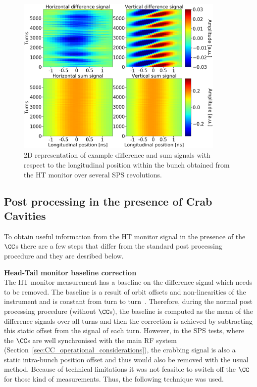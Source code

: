 \begin{figure}[!h]
   \centering         
   \includegraphics[width=0.9\textwidth]{images/Ch4/HT_2D__20180530_135105_colorbar_new_version.png}
       \caption{2D representation of example difference and sum signals with respect to the longitudinal position within the bunch obtained from the HT monitor over several SPS revolutions.}
       \label{fig:HT_example_signals_2D}
\end{figure}

\subsection{Post processing in the presence of Crab Cavities}\label{subsec:HT_post_process_CC}
To obtain useful information from the HT monitor signal in the presence of the $\CC$s there are a few steps that differ from the standard post processing procedure and they are desribed below.

\normalsize{\textbf{Head-Tail monitor baseline correction}}\\
The HT monitor measurement has a baseline on the difference signal which needs to be removed. The baseline is a result of orbit offsets and non-linearities of the instrument and is constant from turn to turn~\cite{Levens:2313358}. Therefore, during the normal post processing procedure (without $\CC$s), the baseline is computed as the mean of the difference signals over all turns and then the correction is achieved by subtracting this static offset from the signal of each turn. However, in the SPS tests, where the $\CC$s are well synchronised with the main RF system (Section~\ref{sec:CC_operational_considerations}), the crabbing signal is also a static intra-bunch position offset and thus would also be removed with the usual method. Because of technical limitations it was not feasible to switch off the $\CC$ for those kind of measurements. Thus, the following technique was used. 

